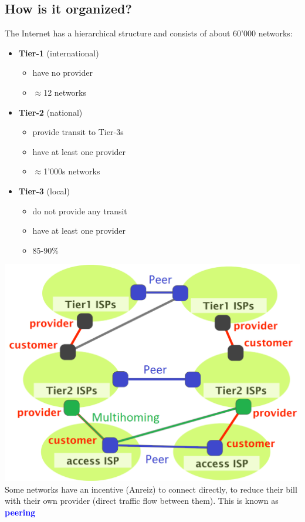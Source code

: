 \documentclass[a4paper, fontsize=8pt, landscape, DIV=1]{scrartcl}
\begin{document}
\begin{multicols*}{4}
			\subsection{How is it organized?}
				The Internet has a hierarchical structure and consists of about 60'000 networks: 
				\begin{itemize}[noitemsep]
					\item \textbf{Tier-1} (international)
					\begin{itemize}
						\item have no provider 
						\item $\approx$12 networks
					\end{itemize}
					\item \textbf{Tier-2} (national)
					\begin{itemize}
						\item provide transit to Tier-3s
						\item have at least one provider 
						\item $\approx$1'000s networks 	
					\end{itemize}
					\item \textbf{Tier-3} (local)
					\begin{itemize}
						\item do not provide any transit
						\item have at least one provider
						\item 85-90\% 
					\end{itemize}
				\end{itemize}
				\includegraphics[width=\columnwidth]{images/Overview/hirarchy.png}
				Some networks have an incentive (Anreiz) to connect directly, to reduce their bill with their own provider (direct traffic flow between them). This is known as \textcolor{Blue}{\textbf{peering}}\par
				

\end{multicols*}
\end{document}
